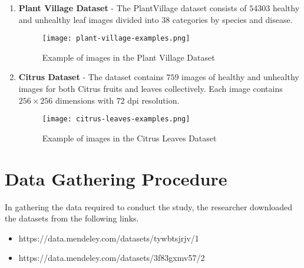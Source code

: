 \begin{enumerate}
    \item \textbf{Plant Village Dataset}  \newline 
        - The PlantVillage dataset consists of $54303$ healthy and unhealthy leaf 
         images divided into $38$ categories by species and disease. 
    
         \begin{figure}[H]
            \centering 
            \texttt{[image: plant-village-examples.png]}
            \caption{Example of images in the Plant Village Dataset}
         \end{figure}


    \item \textbf{Citrus Dataset} \newline 
        - The dataset contains $759$ images of healthy and unhealthy images for both Citrus fruits and
         leaves collectively. Each image contains $256 \times 256$ dimensions with $72$ dpi resolution.  \\ 

         \begin{figure}[H]
            \centering 
            \texttt{[image: citrus-leaves-examples.png]}
            \caption{Example of images in the Citrus Leaves Dataset}
         \end{figure}


\end{enumerate}

\section{Data Gathering Procedure}
In gathering the data required to conduct the study, the 
researcher downloaded the datasets from the following links.

\begin{itemize}
    \item https://data.mendeley.com/datasets/tywbtsjrjv/1
    \item https://data.mendeley.com/datasets/3f83gxmv57/2
\end{itemize}


